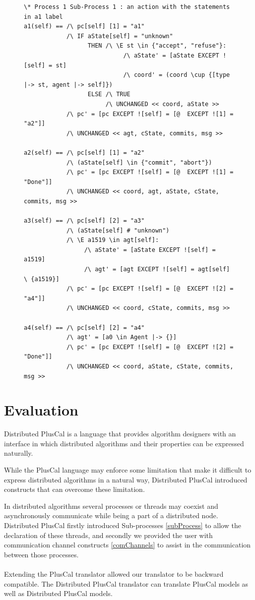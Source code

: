 \documentclass{thesul}
\begin{document}
\begin{enumerate}
\begin{figure}
\begin{lstlisting}[caption = TLA+ translation for Sub-Processes, frame = tlrb, firstnumber = 1]
\* Process 1 Sub-Process 1 : an action with the statements in a1 label
a1(self) == /\ pc[self] [1] = "a1"
            /\ IF aState[self] = "unknown"
                  THEN /\ \E st \in {"accept", "refuse"}:
                            /\ aState' = [aState EXCEPT ![self] = st]
                            /\ coord' = (coord \cup {[type |-> st, agent |-> self]})
                  ELSE /\ TRUE
                       /\ UNCHANGED << coord, aState >>
            /\ pc' = [pc EXCEPT ![self] = [@  EXCEPT ![1] = "a2"]]
            /\ UNCHANGED << agt, cState, commits, msg >>

a2(self) == /\ pc[self] [1] = "a2"
            /\ (aState[self] \in {"commit", "abort"})
            /\ pc' = [pc EXCEPT ![self] = [@  EXCEPT ![1] = "Done"]]
            /\ UNCHANGED << coord, agt, aState, cState, commits, msg >>

a3(self) == /\ pc[self] [2] = "a3"
            /\ (aState[self] # "unknown")
            /\ \E a1519 \in agt[self]:
                 /\ aState' = [aState EXCEPT ![self] = a1519]
                 /\ agt' = [agt EXCEPT ![self] = agt[self] \ {a1519}]
            /\ pc' = [pc EXCEPT ![self] = [@  EXCEPT ![2] = "a4"]]
            /\ UNCHANGED << coord, cState, commits, msg >>

a4(self) == /\ pc[self] [2] = "a4"
            /\ agt' = [a0 \in Agent |-> {}]
            /\ pc' = [pc EXCEPT ![self] = [@  EXCEPT ![2] = "Done"]]
            /\ UNCHANGED << coord, aState, cState, commits, msg >>
\end{lstlisting}
\end{figure}
\FloatBarrier

\end{enumerate}


\section{Evaluation}

Distributed PlusCal is a language that provides algorithm designers with an interface in which distributed algorithms and their properties can be expressed naturally.

While the PlusCal language may enforce some limitation that make it difficult to express distributed algorithms in a natural way, Distributed PlusCal introduced constructs that can overcome these limitation.

In distributed algorithms several processes or threads may coexist and asynchronously communicate while being a part of a distributed node. Distributed PlusCal firstly introduced Sub-processes \ref{subProcess} to allow the declaration of these threads, and secondly we provided the user with communication channel constructs \ref{comChannels} to assist in the communication between those processes.
\\\\
Extending the PlusCal translator allowed our translator to be backward compatible. The Distributed PlusCal translator can translate PlusCal models as well as Distributed PlusCal models.
\end{document}
